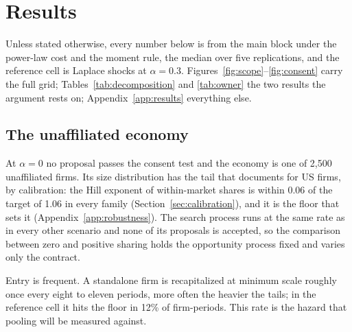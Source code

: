 \section{Results}
\label{sec:Results}

Unless stated otherwise, every number below is from the main block under the power-law cost and the moment rule, the median over five replications, and the reference cell is Laplace shocks at $\alpha = 0.3$. Figures~\ref{fig:scope}--\ref{fig:consent} carry the full grid; Tables~\ref{tab:decomposition} and \ref{tab:owner} the two results the argument rests on; Appendix~\ref{app:results} everything else.

\subsection{The unaffiliated economy}\label{sec:results-baseline}

At $\alpha = 0$ no proposal passes the consent test and the economy is one of 2,500 unaffiliated firms. Its size distribution has the tail that \textcite{axtell2001zipf} documents for US firms, by calibration: the Hill exponent of within-market shares is within 0.06 of the target of 1.06 in every family (Section~\ref{sec:calibration}), and it is the floor that sets it (Appendix~\ref{app:robustness}). The search process runs at the same rate as in every other scenario and none of its proposals is accepted, so the comparison between zero and positive sharing holds the opportunity process fixed and varies only the contract.

Entry is frequent. A standalone firm is recapitalized at minimum scale roughly once every eight to eleven periods, more often the heavier the tails; in the reference cell it hits the floor in 12\% of firm-periods. This rate is the hazard that pooling will be measured against.

